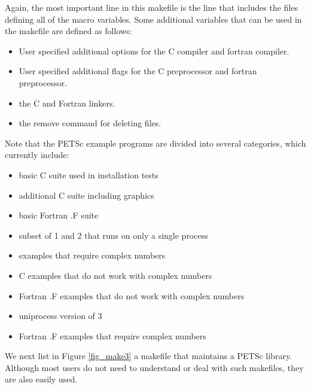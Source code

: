 {{Again, the most important line in this makefile is the 
line that includes the files defining all of the macro variables.
Some additional variables that can be used in the makefile are defined
as follows:
\begin{itemize}
\item {} User specified additional options for the C compiler and
        fortran compiler.
\item {} User specified additional flags for the C preprocessor
        and fortran preprocessor.
\item {} the C and Fortran linkers.
\item {} the remove command for deleting files.
\end{itemize}
Note that the PETSc example programs are divided into several
categories, which currently include:
\begin{itemize}
\item {} basic C suite used in installation tests\\
\item {} additional C suite including graphics\\
\item {} basic Fortran .F suite\\
\item {} subset of 1 and 2 that runs on only a single process\\
\item {} examples that require complex numbers\\
\item {} C examples that do not work with complex numbers\\
\item {} Fortran .F examples that do not work with complex numbers\\
\item {} uniprocess version of 3\\
\item {} Fortran .F examples that require complex numbers\\
\end{itemize}

We next list in Figure \ref{fig_make3} a makefile that maintains a PETSc
library.  Although most users do not need to understand or deal with such
makefiles, they are also easily used.

}}
